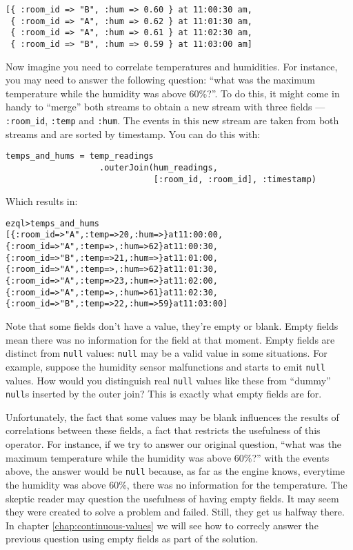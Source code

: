 \documentclass{report}
\newenvironment{evaluation}
{
  \framed
  \begin{alltt}
}
{
  \end{alltt}
  \endframed
}
\begin{document}
\begin{verbatim}
[{ :room_id => "B", :hum => 0.60 } at 11:00:30 am,
 { :room_id => "A", :hum => 0.62 } at 11:01:30 am,
 { :room_id => "A", :hum => 0.61 } at 11:02:30 am,
 { :room_id => "B", :hum => 0.59 } at 11:03:00 am]
\end{verbatim}

Now imagine you need to correlate temperatures and humidities. For
instance, you may need to answer the following question: ``what was
the maximum temperature while the humidity was above 60\%?''. To do
this, it might come in handy to ``merge'' both streams to obtain a new
stream with three fields --- \verb=:room_id=, \verb=:temp= and
\verb=:hum=. The events in this new stream are taken from both
streams and are sorted by timestamp. You can do this with:

\begin{verbatim}
temps_and_hums = temp_readings
                   .outerJoin(hum_readings,
                              [:room_id, :room_id], :timestamp)
\end{verbatim}

Which results in:
\pagebreak
\begin{evaluation}
ezql> temps_and_hums
[\{ :room_id => "A", :temp =>  20, :hum =>     \} at 11:00:00,
 \{ :room_id => "A", :temp =>    , :hum =>  62 \} at 11:00:30,
 \{ :room_id => "B", :temp =>  21, :hum =>     \} at 11:01:00,
 \{ :room_id => "A", :temp =>    , :hum =>  62 \} at 11:01:30,
 \{ :room_id => "A", :temp =>  23, :hum =>     \} at 11:02:00,
 \{ :room_id => "A", :temp =>    , :hum =>  61 \} at 11:02:30,
 \{ :room_id => "B", :temp =>  22, :hum =>  59 \} at 11:03:00]
\end{evaluation}

Note that some fields don't have a value, they're empty or
blank. Empty fields mean there was no information for the field at
that moment. Empty fields are distinct from \verb=null= values:
\verb=null= may be a valid value in some situations. For example,
suppose the humidity sensor malfunctions and starts to emit
\verb=null= values. How would you distinguish real \verb=null= values
like these from ``dummy'' \verb=null=s inserted by the outer join?
This is exactly what empty fields are for.

Unfortunately, the fact that some values may be blank influences the
results of correlations between these fields, a fact that restricts
the usefulness of this operator. For instance, if we try to answer our
original question, ``what was the maximum temperature while the
humidity was above 60\%?'' with the events above, the answer would be
\verb=null= because, as far as the engine knows, everytime the
humidity was above 60\%, there was no information for the
temperature. The skeptic reader may question the usefulness of having
empty fields. It may seem they were created to solve a problem and
failed. Still, they get us halfway there. In chapter
\ref{chap:continuous-values} we will see how to correcly answer the
previous question using empty fields as part of the solution.
\end{document}
